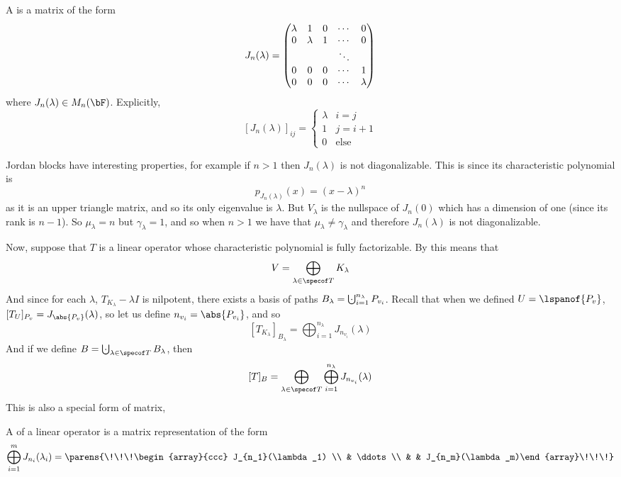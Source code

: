 \begin{defn*}

    A  is a matrix of the form
    \[ J_n(\lambda) = \begin{pmatrix}\lambda & 1 & 0 & \cdots & 0 \\ 0 & \lambda & 1 & \cdots & 0 \\ & & & \ddots & \\ 0 & 0 & 0 & \cdots & 1 \\ 0 & 0 & 0 & \cdots & \lambda\end{pmatrix} \]
    where $J_n(\lambda)\in M_n(\bF)$.
    Explicitly,
    \[ [J_n(\lambda)]_{ij} = \begin{cases} \lambda & i=j \\ 1 & j = i+1 \\ 0 & \text{else} \end{cases} \]

\end{defn*}

Jordan blocks have interesting properties, for example if $n>1$ then $J_n(\lambda)$ is not diagonalizable.
This is since its characteristic polynomial is
\[ p_{J_n(\lambda)}(x) = (x-\lambda)^n \]
as it is an upper triangle matrix, and so its only eigenvalue is $\lambda$.
But $V_\lambda$ is the nullspace of $J_n(0)$ which has a dimension of one (since its rank is $n-1$).
So $\mu_\lambda=n$ but $\gamma_\lambda=1$, and so when $n>1$ we have that $\mu_\lambda\neq\gamma_\lambda$ and therefore $J_n(\lambda)$ is not diagonalizable.

Now, suppose that $T$ is a linear operator whose characteristic polynomial is fully factorizable.
By  this means that
\[ V = \bigoplus_{\lambda\in\specof T}K_\lambda \]
And since for each $\lambda$, $T_{K_\lambda}-\lambda I$ is nilpotent, there exists a basis of paths $B_\lambda = \bigdcup_{i=1}^{n_\lambda}P_{v_i}$.
Recall that when we defined $U=\lspanof{P_v}$, $[T_U]_{P_v}=J_{\abs{P_v}}(\lambda)$, so let us define $n_{v_i}=\abs{P_{v_i}}$, and so
\[ [T_{K_\lambda}]_{B_\lambda} = \bigoplus_{i=1}^{n_\lambda}J_{n_{v_i}}(\lambda) \]
And if we define $B=\bigdcup_{\lambda\in\specof T}B_\lambda$, then
\[ [T]_B = \bigoplus_{\lambda\in\specof T}\bigoplus_{i=1}^{n_\lambda} J_{n_{v_i}}(\lambda) \]
This is also a special form of matrix,

\begin{defn*}

    A  of a linear operator is a matrix representation of the form
    \[ \bigoplus_{i=1}^m J_{n_i}(\lambda_i) = \parens{\!\!\!\begin{array}{ccc} J_{n_1}(\lambda_1) \\ & \ddots \\ & & J_{n_m}(\lambda_m)\end{array}\!\!\!} \]

\end{defn*}

